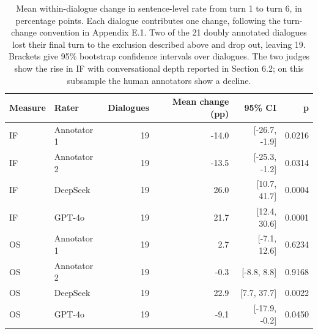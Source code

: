 \begin{table}[t]
\centering
\small
\caption{Mean within-dialogue change in sentence-level rate from turn 1 to turn 6, in percentage points. Each dialogue contributes one change, following the turn-change convention in Appendix E.1. Two of the 21 doubly annotated dialogues lost their final turn to the exclusion described above and drop out, leaving 19. Brackets give 95\% bootstrap confidence intervals over dialogues. The two judges show the rise in IF with conversational depth reported in Section 6.2; on this subsample the human annotators show a decline.}
\label{tab:human_turn_change}
\begin{tabular}{llrrrr}
\toprule
Measure & Rater & Dialogues & Mean change (pp) & 95\% CI & p \\
\midrule
IF & Annotator 1 & 19 & -14.0 & [-26.7, -1.9] & 0.0216 \\
IF & Annotator 2 & 19 & -13.5 & [-25.3, -1.2] & 0.0314 \\
IF & DeepSeek & 19 & 26.0 & [10.7, 41.7] & 0.0004 \\
IF & GPT-4o & 19 & 21.7 & [12.4, 30.6] & 0.0001 \\
OS & Annotator 1 & 19 & 2.7 & [-7.1, 12.6] & 0.6234 \\
OS & Annotator 2 & 19 & -0.3 & [-8.8, 8.8] & 0.9168 \\
OS & DeepSeek & 19 & 22.9 & [7.7, 37.7] & 0.0022 \\
OS & GPT-4o & 19 & -9.1 & [-17.9, -0.2] & 0.0450 \\
\bottomrule
\end{tabular}
\end{table}
